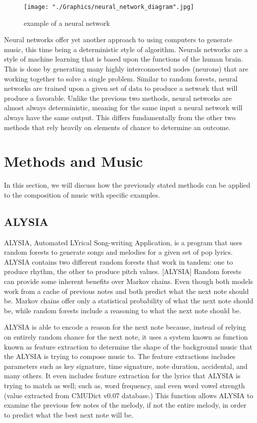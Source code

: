 \documentclass{sig-alternate}
\begin{document}
\begin{figure}[H]
	\texttt{[image: "./Graphics/neural\_network\_diagram".jpg]}
	\caption{example of a neural network}
	\label{fig:neuralnetexample}
\end{figure}
	
	Neural networks offer yet another approach to using computers to generate music, this time being a deterministic style of algorithm. Neurals networks are a style of machine learning that is based upon the functions of the human brain. This is done by generating many highly interconnected nodes (neurons) that are working together to solve a single problem. Similar to random forests, neural networks are trained upon a given set of data to produce a network that will produce a favorable. Unlike the previous two methods, neural networks are almost always deterministic, meaning for the same input a neural network will always have the same output. This differs fundamentally from the other two methods that rely heavily on elements of chance to determine an outcome.
\section{Methods and Music}
	In this section, we will discuss how the previously stated methods can be applied to the composition of music with specific examples.
\subsection{ALYSIA}
\label{sec:ALYSIA}
	ALYSIA, Automated LYrical Song-writing Application, is a program that uses random forests to generate songs and melodies for a given set of pop lyrics. ALYSIA contains two different random forests that work in tandem: one to produce rhythm, the other to produce pitch values. [ALYSIA] Random forests can provide some inherent benefits over Markov chains. Even though both models work from a cache of previous notes and both predict what the next note should be. Markov chains offer only a statistical probability of what the next note should be, while random forests include a reasoning to what the next note should be.
	
	ALYSIA is able to encode a reason for the next note because, instead of relying on entirely random chance for the next note, it uses a system known as function known as feature extraction to determine the shape of the background music that the ALYSIA is trying to compose music to. The feature extractions includes parameters such as key signature, time signature, note duration, accidental, and many others. It even includes feature extraction for the lyrics that ALYSIA is trying to match as well; such as, word frequency, and even word vowel strength (value extracted from CMUDict v0.07 database.) This function allows ALYSIA to examine the previous few notes of the melody, if not the entire melody, in order to predict what the best next note will be.
\end{document}
